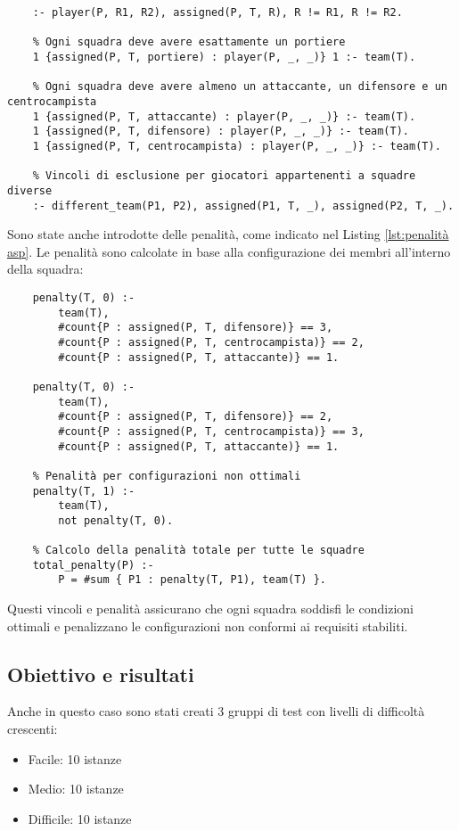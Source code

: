 \documentclass{article}
\begin{document}
\begin{multicols*}{2}
\begin{lstlisting}[style=minizinc, caption={Vincoli ASP}, label={lst:aspVincoli}]
    % Il giocatore deve ricoprire uno dei ruoli che ha scelto
    :- player(P, R1, R2), assigned(P, T, R), R != R1, R != R2.
    
    % Ogni squadra deve avere esattamente un portiere
    1 {assigned(P, T, portiere) : player(P, _, _)} 1 :- team(T).
    
    % Ogni squadra deve avere almeno un attaccante, un difensore e un centrocampista
    1 {assigned(P, T, attaccante) : player(P, _, _)} :- team(T).
    1 {assigned(P, T, difensore) : player(P, _, _)} :- team(T).
    1 {assigned(P, T, centrocampista) : player(P, _, _)} :- team(T).
    
    % Vincoli di esclusione per giocatori appartenenti a squadre diverse
    :- different_team(P1, P2), assigned(P1, T, _), assigned(P2, T, _).
\end{lstlisting}
Sono state anche introdotte delle penalità, come indicato nel Listing \ref{lst:penalità asp}. Le penalità sono calcolate in base alla configurazione dei membri all'interno della squadra:

\begin{lstlisting}[style=minizinc, caption={Penalità ASP}, label={lst:penalità asp}]
    % Calcolo delle penalità per configurazioni ottimali
    penalty(T, 0) :- 
        team(T),
        #count{P : assigned(P, T, difensore)} == 3, 
        #count{P : assigned(P, T, centrocampista)} == 2, 
        #count{P : assigned(P, T, attaccante)} == 1.
    
    penalty(T, 0) :- 
        team(T),
        #count{P : assigned(P, T, difensore)} == 2, 
        #count{P : assigned(P, T, centrocampista)} == 3, 
        #count{P : assigned(P, T, attaccante)} == 1.
    
    % Penalità per configurazioni non ottimali
    penalty(T, 1) :- 
        team(T),
        not penalty(T, 0).
    
    % Calcolo della penalità totale per tutte le squadre
    total_penalty(P) :- 
        P = #sum { P1 : penalty(T, P1), team(T) }.
\end{lstlisting}
Questi vincoli e penalità assicurano che ogni squadra soddisfi le condizioni ottimali e penalizzano le configurazioni non conformi ai requisiti stabiliti.




\subsection{Obiettivo e risultati}
Anche in questo caso sono stati creati 3 gruppi di test con livelli di difficoltà crescenti:
\begin{itemize}
    \item Facile: 10 istanze
    \item Medio: 10 istanze
    \item Difficile: 10 istanze
\end{itemize}













\end{multicols*}
\end{document}
